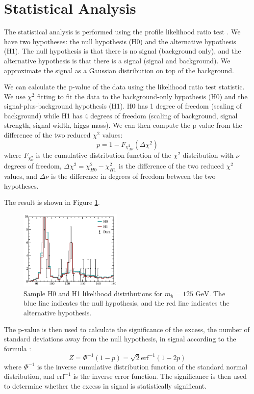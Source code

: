 \section{Statistical Analysis}
The statistical analysis is performed using the profile likelihood ratio test \cite{Cowan:2010js}. We have two hypotheses: the null hypothesis (H0) and the alternative hypothesis (H1). The null hypothesis is that there is no signal (background only), and the alternative hypothesis is that there is a signal (signal and background). We approximate the signal as a Gaussian distribution on top of the background. 


We can calculate the p-value of the data using the likelihood ratio test statistic. We use $\chi^2$ fitting to fit the data to the background-only hypothesis (H0) and the signal-plus-background hypothesis (H1). H0 has 1 degree of freedom (scaling of background) while H1 has 4 degrees of freedom (scaling of background, signal strength, signal width, higgs mass). We can then compute the p-value from the difference of the two reduced $\chi^2$ values:
\begin{equation}
  p = 1 - F_{\chi^2_{\Delta \nu}}(\Delta \chi^2)
\end{equation}
where $F_{\chi^2_{\nu}}$ is the cumulative distribution function of the $\chi^2$ distribution with $\nu$ degrees of freedom, $\Delta \chi^2 = \chi^2_{H0} - \chi^2_{H1}$ is the difference of the two reduced $\chi^2$ values, and $\Delta\nu$ is the difference in degrees of freedom between the two hypotheses. 

The result is shown in Figure \ref{fig:likelihood}. 
\begin{figure}[h]
  \centering
  \includegraphics[width=0.45\textwidth]{Figures/hypo_testing.png}
  \caption{Sample H0 and H1 likelihood distributions for $m_h=125\text{ GeV}$. The blue line indicates the null hypothesis, and the red line indicates the alternative hypothesis.}
  \label{fig:likelihood}
\end{figure}

The p-value is then used to calculate the significance of the excess, the number of standard deviations away from the null hypothesis, in signal according to the formula \cite{Cowan:2010js}:
\begin{equation}
  Z = \Phi^{-1}(1 - p) = \sqrt{2} \text{erf}^{-1}(1 - 2p)
\end{equation}
where $\Phi^{-1}$ is the inverse cumulative distribution function of the standard normal distribution, and $\text{erf}^{-1}$ is the inverse error function. The significance is then used to determine whether the excess in signal is statistically significant.


